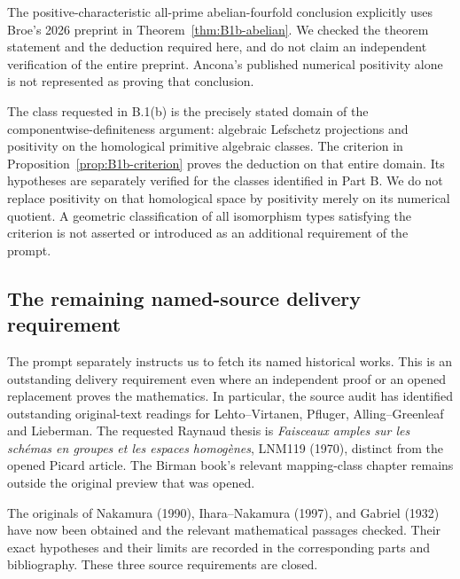 The positive-characteristic all-prime abelian-fourfold conclusion
explicitly uses Broe's 2026 preprint in
Theorem~\ref{thm:B1b-abelian}. We checked the theorem statement and the
deduction required here, and do not claim an independent verification
of the entire preprint. Ancona's published numerical positivity alone
is not represented as proving that conclusion.

The class requested in B.1(b) is the precisely stated domain of the
componentwise-definiteness argument: algebraic Lefschetz projections
and positivity on the homological primitive algebraic classes.
The criterion in Proposition~\ref{prop:B1b-criterion} proves the
deduction on that entire domain. Its hypotheses are separately
verified for the classes identified in Part B. We do not replace
positivity on that homological space by positivity merely on its
numerical quotient. A geometric classification of all isomorphism
types satisfying the criterion is not asserted or introduced as an
additional requirement of the prompt.

\subsection{The remaining named-source delivery requirement}
The prompt separately instructs us to fetch its named historical works.
This is an outstanding delivery requirement even where an independent
proof or an opened replacement proves the mathematics. In particular,
the source audit has identified outstanding original-text readings for
Lehto--Virtanen, Pfluger, Alling--Greenleaf and Lieberman. The requested Raynaud
thesis is \emph{Faisceaux amples sur les sch\'emas en groupes et les
espaces homog\`enes}, LNM119 (1970), distinct from the opened Picard
article. The Birman book's relevant mapping-class chapter remains
outside the original preview that was opened.

The originals of Nakamura (1990), Ihara--Nakamura (1997), and
Gabriel (1932) have now been obtained and the relevant mathematical
passages checked. Their exact hypotheses and their limits are recorded
in the corresponding parts and bibliography. These three source
requirements are closed.


